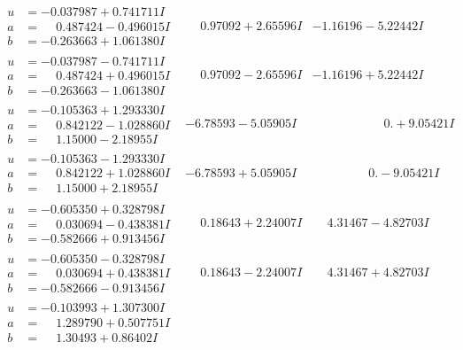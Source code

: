 \documentclass[1p]{elsarticle_modified}
\theoremstyle{definition}
\begin{document}
$$\begin{array}{c|c|c}
\begin{aligned}
u &= -0.037987 + 0.741711 I \\
a &= \phantom{-}0.487424 - 0.496015 I \\
b &= -0.263663 + 1.061380 I\end{aligned}
 & \phantom{-}0.97092 + 2.65596 I & -1.16196 - 5.22442 I \\ \hline\begin{aligned}
u &= -0.037987 - 0.741711 I \\
a &= \phantom{-}0.487424 + 0.496015 I \\
b &= -0.263663 - 1.061380 I\end{aligned}
 & \phantom{-}0.97092 - 2.65596 I & -1.16196 + 5.22442 I \\ \hline\begin{aligned}
u &= -0.105363 + 1.293330 I \\
a &= \phantom{-}0.842122 - 1.028860 I \\
b &= \phantom{-}1.15000 - 2.18955 I\end{aligned}
 & -6.78593 - 5.05905 I & \phantom{-0.000000 -}0. + 9.05421 I \\ \hline\begin{aligned}
u &= -0.105363 - 1.293330 I \\
a &= \phantom{-}0.842122 + 1.028860 I \\
b &= \phantom{-}1.15000 + 2.18955 I\end{aligned}
 & -6.78593 + 5.05905 I & \phantom{-0.000000 } 0. - 9.05421 I \\ \hline\begin{aligned}
u &= -0.605350 + 0.328798 I \\
a &= \phantom{-}0.030694 - 0.438381 I \\
b &= -0.582666 + 0.913456 I\end{aligned}
 & \phantom{-}0.18643 + 2.24007 I & \phantom{-}4.31467 - 4.82703 I \\ \hline\begin{aligned}
u &= -0.605350 - 0.328798 I \\
a &= \phantom{-}0.030694 + 0.438381 I \\
b &= -0.582666 - 0.913456 I\end{aligned}
 & \phantom{-}0.18643 - 2.24007 I & \phantom{-}4.31467 + 4.82703 I \\ \hline\begin{aligned}
u &= -0.103993 + 1.307300 I \\
a &= \phantom{-}1.289790 + 0.507751 I \\
b &= \phantom{-}1.30493 + 0.86402 I\end{aligned}

\end{array}$$
\end{document}
